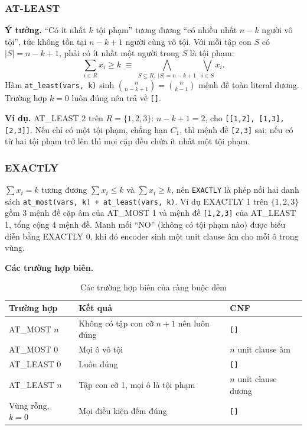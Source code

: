 \subsubsection{AT-LEAST}
\textbf{Ý tưởng.} ``Có ít nhất $k$ tội phạm'' tương đương ``có nhiều nhất
$n-k$ người vô tội'', tức không tồn tại $n-k+1$ người cùng vô tội. Với mỗi
tập con $S$ có $|S| = n-k+1$, phải có ít nhất một người trong $S$ là tội phạm:
\[
\textstyle\sum_{i\in R} x_i \ge k
\;\equiv\;
\bigwedge_{S\subseteq R,\;|S|=n-k+1}\;\bigvee_{i\in S} x_i .
\]
Hàm \texttt{at\_least(vars, k)} sinh $\binom{n}{n-k+1} = \binom{n}{k-1}$ mệnh
đề toàn literal dương. Trường hợp $k=0$ luôn đúng nên trả về \texttt{[]}.

\textbf{Ví dụ.} AT\_LEAST 2 trên $R = \{1,2,3\}$: $n-k+1 = 2$, cho
\texttt{[[1,2], [1,3], [2,3]]}. Nếu chỉ có một tội phạm, chẳng hạn $C_1$, thì
mệnh đề \texttt{[2,3]} sai; nếu có từ hai tội phạm trở lên thì mọi cặp đều
chứa ít nhất một tội phạm.

\subsubsection{EXACTLY}
$\sum x_i = k$ tương đương $\sum x_i \le k$ và $\sum x_i \ge k$, nên
\texttt{EXACTLY} là phép nối hai danh sách
\texttt{at\_most(vars, k) + at\_least(vars, k)}. Ví dụ EXACTLY 1 trên
$\{1,2,3\}$ gồm 3 mệnh đề cặp âm của AT\_MOST 1 và mệnh đề \texttt{[1,2,3]}
của AT\_LEAST 1, tổng cộng 4 mệnh đề. Manh mối ``NO'' (không có tội phạm nào)
được biểu diễn bằng EXACTLY 0, khi đó encoder sinh một unit clause âm cho
mỗi ô trong vùng.

\textbf{Các trường hợp biên.}
\begin{table}[H]
\centering
\begin{tabularx}{\linewidth}{lYl}
\toprule
Trường hợp & Kết quả & CNF \\
\midrule
AT\_MOST $n$ & Không có tập con cỡ $n+1$ nên luôn đúng & \texttt{[]} \\
AT\_MOST 0 & Mọi ô vô tội & $n$ unit clause âm \\
AT\_LEAST 0 & Luôn đúng & \texttt{[]} \\
AT\_LEAST $n$ & Tập con cỡ 1, mọi ô là tội phạm & $n$ unit clause dương \\
Vùng rỗng, $k=0$ & Mọi điều kiện đếm đúng & \texttt{[]} \\
\bottomrule
\end{tabularx}
\caption{Các trường hợp biên của ràng buộc đếm}
\end{table}

